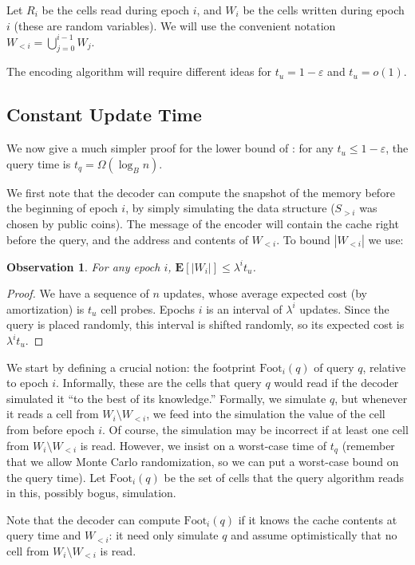 \documentclass[letterpaper,11pt]{article}
\newtheorem{observation}[theorem]{Observation}
\newcommand{\eps}{\varepsilon}
\newcommand{\E}{\mathbf{E}}
\newcommand{\foot}{\mathrm{Foot}}
\begin{document}
Let $R_i$ be the cells read during epoch $i$, and $W_i$ be the cells
written during epoch $i$ (these are random variables). We will use the
convenient notation $W_{<i} = \bigcup_{j=0}^{i-1} W_j$. 

The encoding algorithm will require different ideas for $t_u = 1-\eps$
and $t_u=o(1)$.


\subsection{Constant Update Time}

We now give a much simpler proof for the lower bound of
\cite{verbin10buffer}: for any $t_u \le 1-\eps$, the query time is
$t_q = \Omega(\log_B n)$. 

We first note that the decoder can compute the snapshot of the memory
before the beginning of epoch $i$, by simply simulating the data
structure ($S_{>i}$ was chosen by public coins). The message of the
encoder will contain the cache right before the query, and the address
and contents of $W_{<i}$. To bound $|W_{<i}|$ we use:

\begin{observation}  \label{obs:wi}
For any epoch $i$, $\E[|W_i|] \le \lambda^i t_u$.
\end{observation}

\begin{proof}
We have a sequence of $n$ updates, whose average expected cost (by
amortization) is $t_u$ cell probes. Epochs $i$ is an interval of
$\lambda^i$ updates. Since the query is placed randomly, this interval
is shifted randomly, so its expected cost is $\lambda^i t_u$.
\end{proof}

We start by defining a crucial notion: the footprint $\foot_i(q)$ of
query $q$, relative to epoch $i$. Informally, these are the cells that
query $q$ would read if the decoder simulated it ``to the best of its
knowledge.'' Formally, we simulate $q$, but whenever it reads a cell
from $W_i \setminus W_{<i}$, we feed into the simulation the value of
the cell from before epoch $i$. Of course, the simulation may be
incorrect if at least one cell from $W_i \setminus W_{<i}$ is
read. However, we insist on a worst-case time of $t_q$ (remember that
we allow Monte Carlo randomization, so we can put a worst-case bound
on the query time). Let $\foot_i(q)$ be the set of cells that the
query algorithm reads in this, possibly bogus, simulation.

Note that the decoder can compute $\foot_i(q)$ if it knows the cache
contents at query time and $W_{<i}$: it need only simulate $q$ and
assume optimistically that no cell from $W_i \setminus W_{<i}$ is
read.
\end{document}
